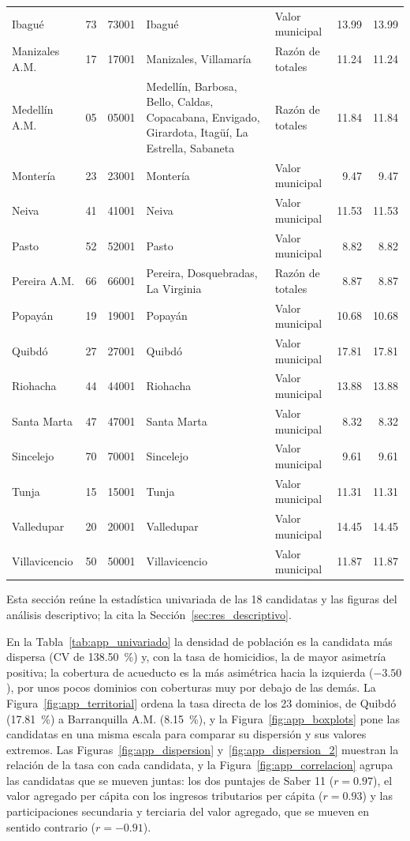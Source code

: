 {\begin{longtable}{p{2.0cm} p{1.0cm} p{1.7cm} p{2.3cm} p{1.9cm} r r}
Ibagué & 73 & 73001 & Ibagué & Valor municipal & 13.99 & 13.99 \\
Manizales A.M. & 17 & 17001 & Manizales, Villamaría & Razón de totales & 11.24 & 11.24 \\
Medellín A.M. & 05 & 05001 & Medellín, Barbosa, Bello, Caldas, Copacabana, Envigado, Girardota, Itagüí, La Estrella, Sabaneta & Razón de totales & 11.84 & 11.84 \\
Montería & 23 & 23001 & Montería & Valor municipal & 9.47 & 9.47 \\
Neiva & 41 & 41001 & Neiva & Valor municipal & 11.53 & 11.53 \\
Pasto & 52 & 52001 & Pasto & Valor municipal & 8.82 & 8.82 \\
Pereira A.M. & 66 & 66001 & Pereira, Dosquebradas, La Virginia & Razón de totales & 8.87 & 8.87 \\
Popayán & 19 & 19001 & Popayán & Valor municipal & 10.68 & 10.68 \\
Quibdó & 27 & 27001 & Quibdó & Valor municipal & 17.81 & 17.81 \\
Riohacha & 44 & 44001 & Riohacha & Valor municipal & 13.88 & 13.88 \\
Santa Marta & 47 & 47001 & Santa Marta & Valor municipal & 8.32 & 8.32 \\
Sincelejo & 70 & 70001 & Sincelejo & Valor municipal & 9.61 & 9.61 \\
Tunja & 15 & 15001 & Tunja & Valor municipal & 11.31 & 11.31 \\
Valledupar & 20 & 20001 & Valledupar & Valor municipal & 14.45 & 14.45 \\
Villavicencio & 50 & 50001 & Villavicencio & Valor municipal & 11.87 & 11.87 \\
\end{longtable}
}
\label{app:descriptivo}

Esta sección reúne la estadística univariada de las 18 candidatas y las figuras del análisis descriptivo; la cita la Sección~\ref{sec:res_descriptivo}.

En la Tabla~\ref{tab:app_univariado} la densidad de población es la candidata más dispersa (CV de 138.50~\%) y, con la tasa de homicidios, la de mayor asimetría positiva; la cobertura de acueducto es la más asimétrica hacia la izquierda ($-3.50$), por unos pocos dominios con coberturas muy por debajo de las demás. La Figura~\ref{fig:app_territorial} ordena la tasa directa de los 23 dominios, de Quibdó (17.81~\%) a Barranquilla A.M. (8.15~\%), y la Figura~\ref{fig:app_boxplots} pone las candidatas en una misma escala para comparar su dispersión y sus valores extremos. Las Figuras~\ref{fig:app_dispersion} y~\ref{fig:app_dispersion_2} muestran la relación de la tasa con cada candidata, y la Figura~\ref{fig:app_correlacion} agrupa las candidatas que se mueven juntas: los dos puntajes de Saber 11 ($r = 0.97$), el valor agregado per cápita con los ingresos tributarios per cápita ($r = 0.93$) y las participaciones secundaria y terciaria del valor agregado, que se mueven en sentido contrario ($r = -0.91$).

